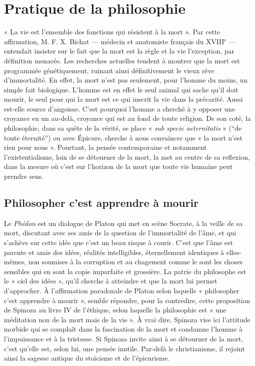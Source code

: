 
\section{Pratique de la philosophie}

« La vie est l'ensemble des fonctions qui résistent à la mort ». Par cette affirmation, M. F. X. Bichat — médecin et anatomiste français du XVIII{$^\text{e}$} — entendait insister sur le fait que la mort est la règle et la vie l'exception, par définition menacée. Les recherches actuelles tendent à montrer que la mort est programmée génétiquement, ruinant ainsi définitivement le vieux rêve d'immortalité. En effet, la mort n'est pas seulement, pour l'homme du moins, un simple fait biologique. L'homme est en effet le seul animal qui sache qu'il doit mourir, le seul pour qui la mort est ce qui inscrit la vie dans la précarité. Aussi est-elle source d'angoisse. C'est pourquoi l'homme a cherché à y opposer une croyance en un au-delà, croyance qui est au fond de toute religion. De son coté, la philosophie, dans sa quête de la vérité, se place « {\it sub specie aeternitatis} » (“de toute éternité”) ou avec Épicure, cherche à nous convaincre que « la mort n'est rien pour nous ». Pourtant, la pensée contemporaine et notamment l'existentialisme, loin de se détourner de la mort, la met au centre de sa reflexion, dans la mesure où c'est sur l'horizon de la mort que toute vie humaine peut prendre sens.

\subsection{Philosopher c'est apprendre à mourir}

Le {\it Phédon} est un dialogue de Platon qui met en scène Socrate, à la veille de sa mort, discutant avec ses amis de la question de l'immortalité de l'âme, et qui s'achève sur cette idée que c'est un beau risque à courir. C'est que l'âme est parente et amie des idées, réalités intelligibles, éternellement identiques à elles-mêmes, non soumises à la corruption et au chagement comme le sont les choses sensibles qui en sont la copie imparfaite et grossière. La patrie du philosophe est le « ciel des idées », qu'il cherche à atteindre et que la mort lui permet d'approcher. À l'affirmation paradoxale de Platon selon laquelle « philosopher c'est apprendre à mourir », semble répondre, pour la contredire, cette proposition de Spinoza au livre IV de l'éthique, selon laquelle la philosophie est « une méditation non de la mort mais de la vie ». À vrai dire, Spinoza vise ici l'attitude morbide qui se complaît dans la fascination de la mort et condamne l'homme à l'impuissance et à la tristesse. Si Spinoza invite ainsi à se détourner de la mort, c'est qu'elle est, selon lui, une pensée inutile. Par-delà le christianisme, il rejoint ainsi la sagesse antique du stoïcisme et de l'épicurisme.

